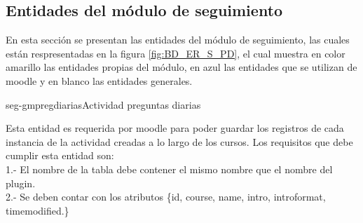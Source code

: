 
\clearpage
\subsection{Entidades del módulo de seguimiento}

 En esta sección se presentan las entidades del módulo de seguimiento,
 las cuales están respresentadas en la figura  \ref{fig:BD_ER_S_PD}, 
 el cual muestra en color amarillo las entidades propias del módulo, 
 en azul las entidades que se utilizan de moodle  y en blanco las entidades generales.


        \begin{cdtEntidad}{seg-gmpregdiarias}{Actividad preguntas diarias}{
                
        Esta entidad es requerida por moodle para poder guardar los registros de cada instancia de la actividad creadas a lo largo de los cursos. Los requisitos que debe cumplir esta entidad son:\\
            1.- El nombre de la tabla debe contener el mismo nombre que el nombre del plugin.\\
            2.- Se deben contar con los atributos \{id, course, name, intro, introformat, timemodified.\}
            }



\end{cdtEntidad}

